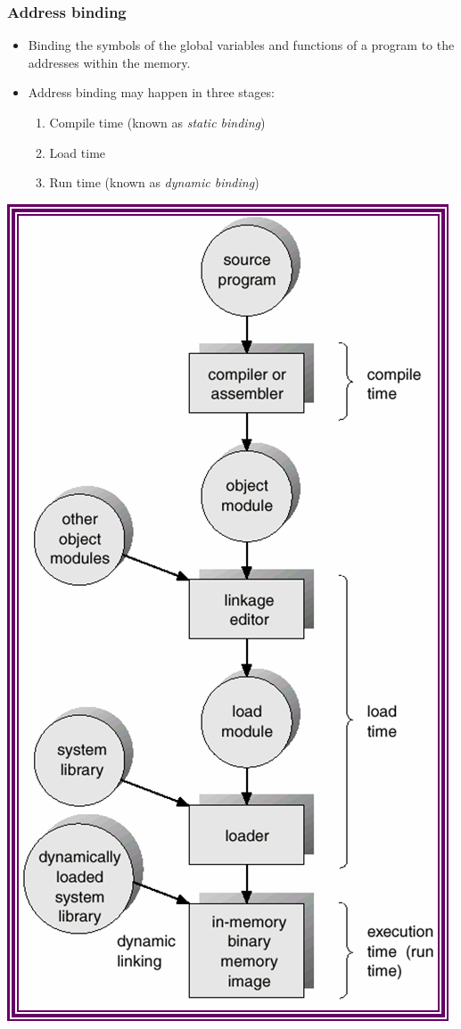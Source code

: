 \documentclass[CJKutf8,xcolor=pdftex,dvipsnames,table]{beamer}
\begin{document}
\begin{CJK*}{UTF8}{song}
  \begin{frame}
    \frametitle{Address binding} \pause
    \begin{minipage}[c]{0.6\textwidth}
      \begin{itemize}
      \item{Binding the symbols of the global variables and functions of a program to the addresses within the memory.} \pause
      \item{Address binding may happen in three stages:} \pause
        \begin{enumerate}
        \item{Compile time (known as \emph{static binding})} \pause
        \item{Load time} \pause
        \item{Run time (known as \emph{dynamic binding})} \pause
        \end{enumerate}
      \end{itemize}
    \end{minipage}%
    \begin{minipage}[c]{0.4\textwidth}
      \includegraphics[scale=.4]{v6f9-1}

\end{minipage}
\end{frame}
\end{CJK*}
\end{document}
